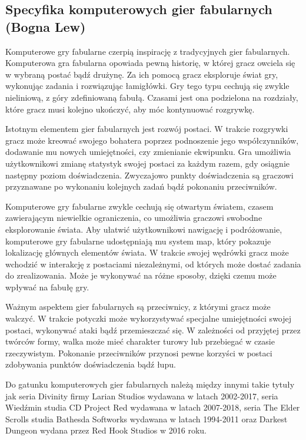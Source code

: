 \subsection{Specyfika komputerowych gier fabularnych (Bogna Lew)}
Komputerowe gry fabularne czerpią inspirację z tradycyjnych gier fabularnych. Komputerowa
gra fabularna opowiada pewną historię, w której gracz owciela się w wybraną postać bądź drużynę.
Za ich pomocą gracz eksploruje świat gry, wykonując zadania i rozwiązując łamigłówki. Gry tego typu cechują się zwykle
nieliniową, z góry zdefiniowaną fabułą. Czasami jest ona podzielona na rozdziały, które gracz musi kolejno ukończyć, aby
móc kontynuować rozgrywkę.

Istotnym elementem gier fabularnych jest rozwój postaci. W trakcie rozgrywki gracz może kreować swojego bohatera
poprzez podnoszenie jego współczynników, dodawanie mu nowych umiejętności, czy zmienianie ekwipunku. Gra umożliwia
użytkownikowi zmianę statystyk swojej postaci za każdym razem, gdy osiągnie następny poziom doświadczenia. Zwyczajowo
punkty doświadczenia są graczowi przyznawane po wykonaniu kolejnych zadań bądź pokonaniu przeciwników.

Komputerowe gry fabularne zwykle cechują się otwartym światem, czasem zawierającym niewielkie ograniczenia, co umożliwia
graczowi swobodne eksplorowanie świata. Aby ułatwić użytkownikowi nawigację i podróżowanie, komputerowe gry fabularne
udostępniają mu system map, który pokazuje lokalizację głównych elementów świata. W trakcie swojej wędrówki gracz może
wchodzić w interakcję z postaciami niezależnymi, od których może dostać zadania do zrealizowania. Może je wykonywać na
różne sposoby, dzięki czemu może wpływać na fabułę gry.

Ważnym aspektem gier fabularnych są przeciwnicy, z którymi gracz może walczyć. W trakcie potyczki może wykorzystywać
specjalne umiejętności swojej postaci, wykonywać ataki bądź przemieszczać się. W zależności od przyjętej przez twórców
formy, walka może mieć charakter turowy lub przebiegać w czasie rzeczywistym. Pokonanie przeciwników przynosi pewne
korzyści w postaci zdobywania punktów doświadczenia bądź łupu.

Do gatunku komputerowych gier fabularnych należą między innymi takie tytuły jak seria Divinity firmy Larian Studios
wydawana w latach 2002-2017, seria Wiedźmin studia CD Project Red wydawana w latach 2007-2018, seria The Elder Scrolls
studia Bathesda Softworks wydawana w latach 1994-2011 oraz Darkest Dungeon wydana przez Red Hook Studios w 2016 roku.
